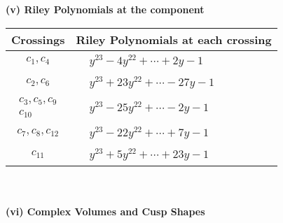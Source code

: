 \documentclass[1p]{elsarticle_modified}
\theoremstyle{definition}
\begin{document}
\newpage\renewcommand{\arraystretch}{1}
\flushleft \textbf{(v) Riley Polynomials at the component}\newline \\
\begin{tabular}{m{50pt}|m{274pt}}
Crossings & \hspace{64pt}Riley Polynomials at each crossing \\
\hline $$\begin{aligned}c_{1},c_{4}\end{aligned}$$&$\begin{aligned}
&y^{23}-4 y^{22}+\cdots+2 y-1
\end{aligned}$\\
\hline $$\begin{aligned}c_{2},c_{6}\end{aligned}$$&$\begin{aligned}
&y^{23}+23 y^{22}+\cdots-27 y-1
\end{aligned}$\\
\hline $$\begin{aligned}c_{3},c_{5},c_{9}\\c_{10}\end{aligned}$$&$\begin{aligned}
&y^{23}-25 y^{22}+\cdots-2 y-1
\end{aligned}$\\
\hline $$\begin{aligned}c_{7},c_{8},c_{12}\end{aligned}$$&$\begin{aligned}
&y^{23}-22 y^{22}+\cdots+7 y-1
\end{aligned}$\\
\hline $$\begin{aligned}c_{11}\end{aligned}$$&$\begin{aligned}
&y^{23}+5 y^{22}+\cdots+23 y-1
\end{aligned}$\\
\hline
\end{tabular}\\~\\
\newpage\flushleft \textbf{(vi) Complex Volumes and Cusp Shapes}
\end{document}
